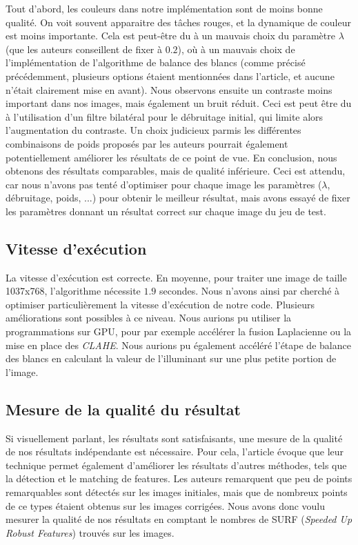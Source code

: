 \documentclass[twoside]{article}
\begin{document}
Tout d'abord, les couleurs dans notre implémentation sont de moins bonne qualité. On voit souvent apparaitre des tâches rouges, et la dynamique de couleur est moins importante. Cela est peut-être du à un mauvais choix du paramètre $\lambda$ (que les auteurs conseillent de fixer à $0.2$), où à un mauvais choix de l'implémentation de l'algorithme de balance des blancs (comme précisé précédemment, plusieurs options étaient mentionnées dans l'article, et aucune n'était clairement mise en avant). 
Nous observons ensuite un contraste moins important dans nos images, mais également un bruit réduit. Ceci est peut être du à l'utilisation d'un filtre bilatéral pour le débruitage initial, qui limite alors l'augmentation du contraste. Un choix judicieux parmis les différentes combinaisons de poids proposés par les auteurs pourrait également potentiellement améliorer les résultats de ce point de vue.
En conclusion, nous obtenons des résultats comparables, mais de qualité inférieure. Ceci est attendu, car nous n'avons pas tenté d'optimiser pour chaque image les paramètres ($\lambda$, débruitage, poids, ...) pour obtenir le meilleur résultat, mais avons essayé de fixer les paramètres donnant un résultat correct sur chaque image du jeu de test.

\subsection{Vitesse d'exécution}
La vitesse d'exécution est correcte. En moyenne, pour traiter une image de taille 1037x768, l'algorithme nécessite $1.9$ secondes. Nous n'avons ainsi par cherché à optimiser particulièrement la vitesse d'exécution de notre code. Plusieurs améliorations sont possibles à ce niveau. Nous aurions pu utiliser la programmations sur GPU, pour par exemple accélérer la fusion Laplacienne ou la mise en place des \emph{CLAHE}. Nous aurions pu également accéléré l'étape de balance des blancs en calculant la valeur de l'illuminant sur une plus petite portion de l'image.

\subsection{Mesure de la qualité du résultat}
Si visuellement parlant, les résultats sont satisfaisants, une mesure de la qualité de nos résultats indépendante est nécessaire. Pour cela, l'article évoque que leur technique permet également d'améliorer les résultats d'autres méthodes, tels que la détection et le matching de features. Les auteurs remarquent que peu de points remarquables sont détectés sur les images initiales, mais que de nombreux points de ce types étaient obtenus sur les images corrigées. Nous avons donc voulu mesurer la qualité de nos résultats en comptant le nombres de SURF (\emph{Speeded Up Robust Features}) trouvés sur les images.
\end{document}
